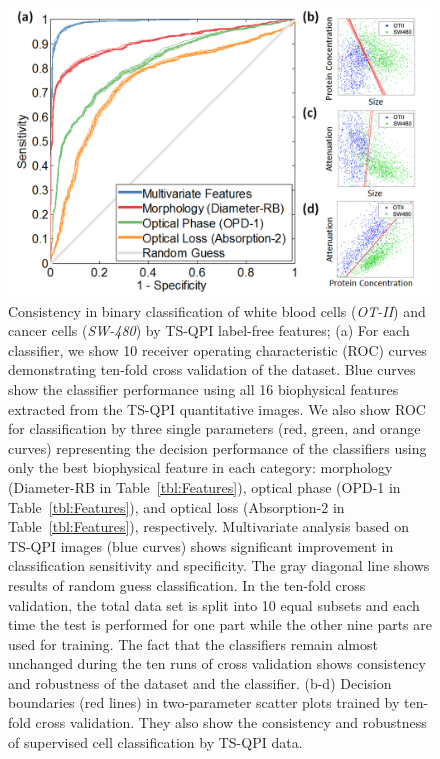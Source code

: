 \documentclass[aps,pra,reprint,longbibliography,superscriptaddress]{revtex4-1}
\begin{document}
\begin{figure}
\includegraphics[scale=0.7]{FigureOTSWROC.jpg}
\caption{\label{fig:OTSWROC} Consistency in binary classification of white blood cells (\textit{OT-II}) and cancer cells (\textit{SW-480}) by TS-QPI label-free features; (a) For each classifier, we show 10 receiver operating characteristic (ROC) curves demonstrating ten-fold cross validation of the dataset. Blue curves show the classifier performance using all 16 biophysical features extracted from the TS-QPI quantitative images. We also show ROC for classification by three single parameters (red, green, and orange curves) representing the decision performance of the classifiers using only the best biophysical feature in each category: morphology (Diameter-RB in Table~\ref{tbl:Features}), optical phase (OPD-1 in Table~\ref{tbl:Features}), and optical loss (Absorption-2 in Table~\ref{tbl:Features}), respectively. Multivariate analysis based on TS-QPI images (blue curves) shows significant improvement in classification sensitivity and specificity. The gray diagonal line shows results of random guess classification. In the ten-fold cross validation, the total data set is split into 10 equal subsets and each time the test is performed for one part while the other nine parts are used for training. The fact that the classifiers remain almost unchanged during the ten runs of cross validation shows consistency and robustness of the dataset and the classifier. (b-d) Decision boundaries (red lines) in two-parameter scatter plots trained by ten-fold cross validation. They also show the consistency and robustness of supervised cell classification by TS-QPI data.}
\end{figure}
\end{document}
